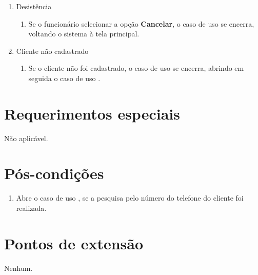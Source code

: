 \begin{enumerate}
	\item Desistência
	\begin{enumerate}
		\item Se o funcionário selecionar a opção \textbf{Cancelar}, o caso de uso se encerra, voltando o
		sistema à tela principal.
	\end{enumerate}
	\item Cliente não cadastrado
	\begin{enumerate}
		\item Se o cliente não foi cadastrado, o caso de uso se encerra, abrindo em seguida o caso de uso .
	\end{enumerate}
\end{enumerate}

\section{Requerimentos especiais}

Não aplicável.

\section{Pós-condições}

\begin{enumerate}
	\item Abre o caso de uso , se a pesquisa pelo número do telefone do cliente foi realizada.
\end{enumerate}

\section{Pontos de extensão}

Nenhum.